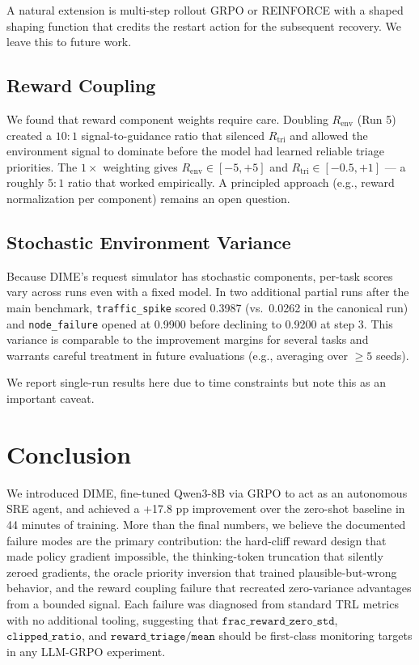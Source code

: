\documentclass{article}
\begin{document}
A natural extension is multi-step rollout GRPO or REINFORCE with a shaped shaping
function that credits the restart action for the subsequent recovery. We leave this to
future work.

\subsection{Reward Coupling}

We found that reward component weights require care. Doubling $R_{\mathrm{env}}$ (Run 5)
created a $10:1$ signal-to-guidance ratio that silenced $R_{\mathrm{tri}}$ and allowed
the environment signal to dominate before the model had learned reliable triage
priorities. The $1\times$ weighting gives $R_{\mathrm{env}} \in [-5, +5]$ and
$R_{\mathrm{tri}} \in [-0.5, +1]$ --- a roughly $5:1$ ratio that worked empirically. A
principled approach (e.g., reward normalization per component) remains an open question.

\subsection{Stochastic Environment Variance}

Because DIME's request simulator has stochastic components, per-task scores vary across
runs even with a fixed model. In two additional partial runs after the main benchmark,
\texttt{traffic\_spike} scored 0.3987 (vs.\ 0.0262 in the canonical run) and
\texttt{node\_failure} opened at 0.9900 before declining to 0.9200 at step 3. This
variance is comparable to the improvement margins for several tasks and warrants careful
treatment in future evaluations (e.g., averaging over $\geq 5$ seeds).

We report single-run results here due to time constraints but note this as an important caveat.

\section{Conclusion}

We introduced DIME, fine-tuned Qwen3-8B via GRPO to act as an autonomous SRE agent,
and achieved a +17.8 pp improvement over the zero-shot baseline in 44 minutes of
training. More than the final numbers, we believe the documented failure modes are the
primary contribution: the hard-cliff reward design that made policy gradient impossible, the
thinking-token truncation that silently zeroed gradients, the oracle priority inversion
that trained plausible-but-wrong behavior, and the reward coupling failure that
recreated zero-variance advantages from a bounded signal. Each failure was diagnosed
from standard TRL metrics with no additional tooling, suggesting that
$\texttt{frac\_reward\_zero\_std}$, $\texttt{clipped\_ratio}$, and
$\texttt{reward\_triage/mean}$ should be first-class monitoring targets in any
LLM-GRPO experiment.
\end{document}
